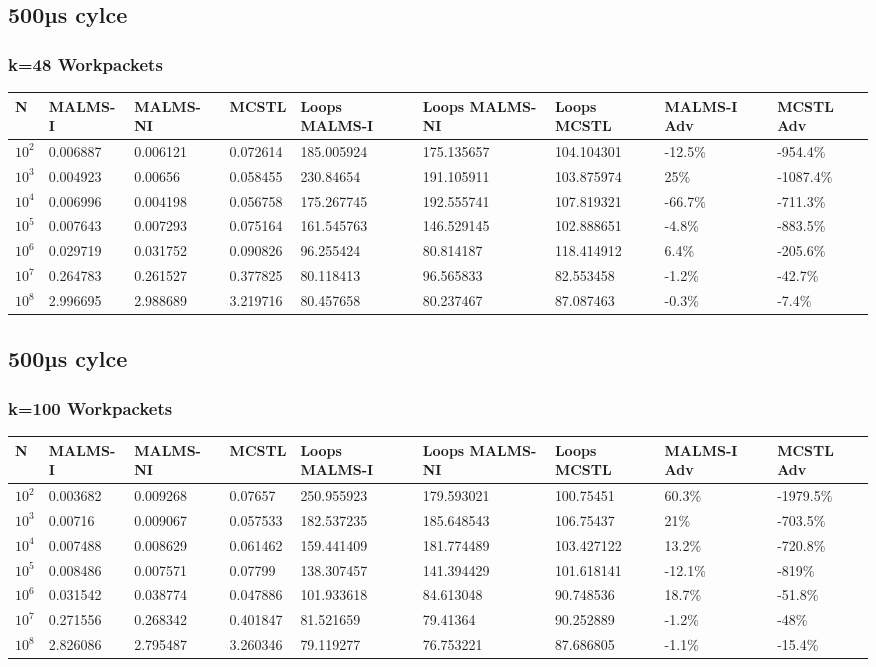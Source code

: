 \documentclass[landscape]{article}
\begin{document}
\subsection*{500µs cylce}
\subsubsection{k=48 Workpackets}
\begin{tabular}{l|l|l|l|l|l|l|l|l}
N	& MALMS-I 	& MALMS-NI	& MCSTL		& Loops MALMS-I	& Loops MALMS-NI & Loops MCSTL & MALMS-I Adv	& MCSTL Adv		\\
\hline
$10^2$		& 0.006887	& 0.006121	& 0.072614	& 185.005924	& 175.135657	& 104.104301	& -12.5\%  	& -954.4\% \\
$10^3$		& 0.004923	& 0.00656	& 0.058455	& 230.84654	& 191.105911	& 103.875974	& 25\%  	& -1087.4\% \\
$10^4$		& 0.006996	& 0.004198	& 0.056758	& 175.267745	& 192.555741	& 107.819321	& -66.7\%  	& -711.3\% \\
$10^5$		& 0.007643	& 0.007293	& 0.075164	& 161.545763	& 146.529145	& 102.888651	& -4.8\%  	& -883.5\% \\
$10^6$		& 0.029719	& 0.031752	& 0.090826	& 96.255424	& 80.814187	& 118.414912	& 6.4\%  	& -205.6\% \\
$10^7$		& 0.264783	& 0.261527	& 0.377825	& 80.118413	& 96.565833	& 82.553458	& -1.2\%  	& -42.7\% \\
$10^8$		& 2.996695	& 2.988689	& 3.219716	& 80.457658	& 80.237467	& 87.087463	& -0.3\%  	& -7.4\% \\
\end{tabular}
\subsection*{500µs cylce}
\subsubsection{k=100 Workpackets}
\begin{tabular}{l|l|l|l|l|l|l|l|l}
N	& MALMS-I 	& MALMS-NI	& MCSTL		& Loops MALMS-I	& Loops MALMS-NI & Loops MCSTL & MALMS-I Adv	& MCSTL Adv		\\
\hline
$10^2$		& 0.003682	& 0.009268	& 0.07657	& 250.955923	& 179.593021	& 100.75451	& 60.3\%  	& -1979.5\% \\
$10^3$		& 0.00716	& 0.009067	& 0.057533	& 182.537235	& 185.648543	& 106.75437	& 21\%  	& -703.5\% \\
$10^4$		& 0.007488	& 0.008629	& 0.061462	& 159.441409	& 181.774489	& 103.427122	& 13.2\%  	& -720.8\% \\
$10^5$		& 0.008486	& 0.007571	& 0.07799	& 138.307457	& 141.394429	& 101.618141	& -12.1\%  	& -819\% \\
$10^6$		& 0.031542	& 0.038774	& 0.047886	& 101.933618	& 84.613048	& 90.748536	& 18.7\%  	& -51.8\% \\
$10^7$		& 0.271556	& 0.268342	& 0.401847	& 81.521659	& 79.41364	& 90.252889	& -1.2\%  	& -48\% \\
$10^8$		& 2.826086	& 2.795487	& 3.260346	& 79.119277	& 76.753221	& 87.686805	& -1.1\%  	& -15.4\% \\
\end{tabular}
\end{document}
